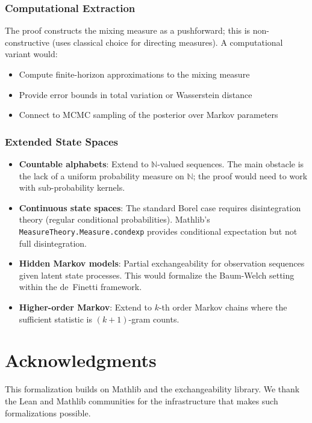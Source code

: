 \documentclass[11pt,a4paper]{article}
\theoremstyle{definition}
\begin{document}
\subsubsection{Computational Extraction}

The proof constructs the mixing measure as a pushforward; this is
non-constructive (uses classical choice for directing measures).
A computational variant would:
\begin{itemize}
\item Compute finite-horizon approximations to the mixing measure
\item Provide error bounds in total variation or Wasserstein distance
\item Connect to MCMC sampling of the posterior over Markov parameters
\end{itemize}

\subsubsection{Extended State Spaces}

\begin{itemize}
\item \textbf{Countable alphabets}: Extend to $\mathbb{N}$-valued sequences.
  The main obstacle is the lack of a uniform probability measure on $\mathbb{N}$;
  the proof would need to work with sub-probability kernels.
\item \textbf{Continuous state spaces}: The standard Borel case requires
  disintegration theory (regular conditional probabilities). Mathlib's
  \texttt{MeasureTheory.Measure.condexp} provides conditional expectation
  but not full disintegration.
\item \textbf{Hidden Markov models}: Partial exchangeability for observation
  sequences given latent state processes. This would formalize the Baum-Welch
  setting within the de~Finetti framework.
\item \textbf{Higher-order Markov}: Extend to $k$-th order Markov chains
  where the sufficient statistic is $(k+1)$-gram counts.
\end{itemize}

\section*{Acknowledgments}

This formalization builds on Mathlib and the exchangeability library.
We thank the Lean and Mathlib communities for the infrastructure that
makes such formalizations possible.
\end{document}
